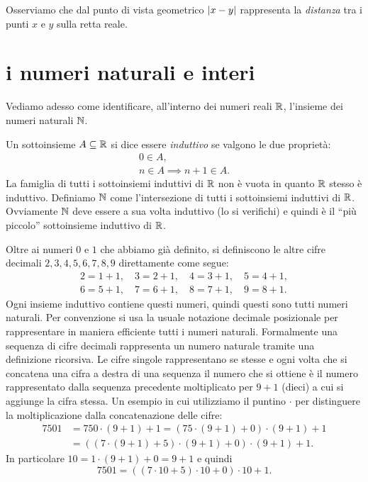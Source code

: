 Osserviamo che dal punto di vista geometrico
${\left|x-y\right|}$ rappresenta la \emph{distanza} tra i punti
$x$ e $y$ sulla retta reale.
  
\section{i numeri naturali e interi}

Vediamo adesso come identificare, all'interno dei numeri reali $\mathbb R$,
l'insieme dei numeri naturali $\NN$.

\begin{definition}
  \label{def:naturali}%
  Un sottoinsieme $A\subseteq \mathbb R$ si dice essere \emph{induttivo}
  se valgono le due proprietà:
  \begin{gather*}
    0 \in A, \\
    n\in A \implies n+1 \in A.
  \end{gather*}
  La famiglia di tutti i sottoinsiemi induttivi di $\mathbb R$ non è vuota
  in quanto $\mathbb R$ stesso è induttivo. Definiamo $\NN$ come l'intersezione
  di tutti i sottoinsiemi induttivi di $\mathbb R$. 
  Ovviamente $\NN$ deve essere a sua volta induttivo (lo si verifichi) 
  e quindi è il ``più piccolo'' sottoinsieme induttivo di $\mathbb R$.
  \mymargin{$\NN$}
\end{definition}

Oltre ai numeri $0$ e $1$ che abbiamo già definito, si definiscono 
le altre cifre decimali $2,3,4,5,6,7,8,9$ direttamente come segue:
\begin{gather*}
 2 = 1+1,\quad
 3 = 2+1,\quad 
 4 = 3+1,\quad
 5 = 4+1,\\ 
 6 = 5+1,\quad
 7 = 6+1,\quad
 8 = 7+1,\quad
 9 = 8+1.
\end{gather*}
Ogni insieme induttivo contiene questi numeri, quindi questi sono 
tutti numeri naturali.
Per convenzione si usa la usuale notazione decimale posizionale
per rappresentare in maniera efficiente
tutti i numeri naturali. 
Formalmente una sequenza di cifre decimali rappresenta un numero naturale 
tramite una definizione ricorsiva. 
Le cifre singole rappresentano se stesse e ogni volta che si concatena una cifra 
a destra di una sequenza il numero che si ottiene è il numero rappresentato 
dalla sequenza precedente moltiplicato per $9+1$ (dieci) a cui si aggiunge la cifra
stessa. 
Un esempio in cui utilizziamo il puntino $\cdot$ per distinguere la moltiplicazione dalla concatenazione 
delle cifre:
\begin{align*}
7501 &= 750\cdot (9+1) + 1 = (75\cdot (9+1)+0)\cdot (9+1) + 1 \\
&= ((7\cdot (9+1)+5)\cdot(9+1)+0)\cdot (9+1) + 1.
\end{align*}
In particolare $10 = 1\cdot (9+1) + 0 = 9+1$ e quindi
\[
7501 = ((7\cdot 10+5)\cdot 10+0)\cdot 10 + 1.
\]

